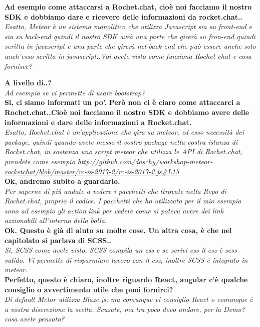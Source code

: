 \documentclass[10 pt,a4paper, openany]{article}
\begin{document}
\textbf{Ad esempio come attaccarsi a Rochet.chat, cioè noi facciamo il nostro SDK e dobbiamo dare e ricevere delle informazioni da rocket.chat..}\\
\textit{Esatto, Meteor è un sistema monolitico che utilizza Javascript sia su front-end e sia su back-end quindi il nostro SDK avrà una parte che girerà su fron-end quindi scritta in javascript e una parte che girerà nel back-end che può essere anche solo anch'esso scritta in javascript..Voi avete visto come funziona Rochet-chat e cosa fornisce?}

\textbf{A livello di..?}\\
\textit{Ad esempio se vi permette di usare bootstrap?}\\

\textbf{Si, ci siamo informati un po'. Però non ci è ciaro come attaccarci a Rochet.chat..Cioè noi facciamo il nostro SDK e dobbiamo avere delle informazioni e dare delle informazioni a Rocket.chat.}\\
\textit{Esatto, Rochet.chat è un'applicazione che gira su meteor, ed esso necessità dei package, quindi quando avete messo il vostro package nella vostra istanza di Rocket.chat, in sostanza uno script meteor che utilizza le API di Rochet.chat, prendete come esempio \url{http://github.com/daschy/workshop-meteor-rocketchat/blob/master/rc-is-2017-2/rc-is-2017-2.js#L15}
}\\

\textbf{Ok, andremo subito a guardarlo.}\\
\textit{ Per saperne di più andate a vedere i pacchetti che ttrovate nella Repo di Rochet.chat, proprio il codice. I pacchetti che ho utilizzato per il mio esempio sono ad esempio gli action link per vedere come si poteva avere dei link azzionabili all'interno della bolla.}\\

\textbf{Ok. Questo è già di aiuto su molte cose. Un altra cosa, è che nel capitolato si parlava di SCSS..}\\
\textit{Si, SCSS come avete visto, SCSS compila un css e se scrivi css il css è scss valido.
Vi permette di risparmiare lavoro con il css, inoltre SCSS è integrato in meteor.}\\

\textbf{Perfetto, questo è chiaro, inoltre riguardo React, angular c'è qualche consiglio o avvertimento utile che puoi fornirci?}\\
\textit{Di default Metor utilizza Blaze.js, ma comunque vi consiglio React o comunque è a vostra discrezione la scelta. Scusate, ma tra poco devo andare, per la Demo? cosa avete pensato?}\\
\end{document}
